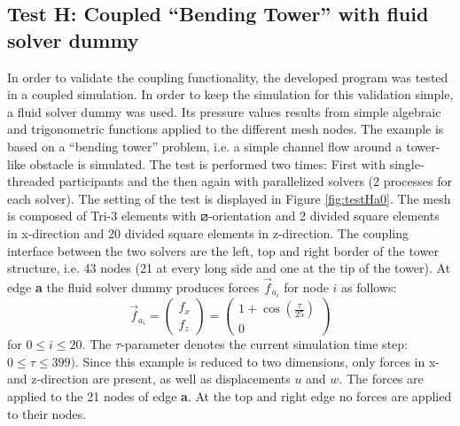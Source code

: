  \subsection{Test H: Coupled ``Bending Tower'' with fluid solver dummy}\label{sec:valid-H}
  In order to validate the coupling functionality, the developed program was tested in a coupled simulation. In order to keep the simulation for this validation simple, a fluid solver dummy was used. Its pressure values results from simple algebraic and trigonometric functions applied to the different mesh nodes. The example is based on a ``bending tower'' problem, i.e. a simple channel flow around a tower-like obstacle is simulated. The test is performed two times: First with single-threaded participants and the then again with parallelized solvers (2 processes for each solver). The setting of the test is displayed in Figure \ref{fig:testHa0}. The mesh is composed of Tri-3 elements with $\boxslash$-orientation and 2 divided square elements in x-direction and 20 divided square elements in z-direction. The coupling interface between the two solvers are the left, top and right border of the tower structure, i.e. 43 nodes (21 at every long side and one at the tip of the tower). At edge \textbf{a} the fluid solver dummy produces forces $\vec{f}_{a_i}$ for node $i$ as follows:
  \begin{equation*}
  \vec{f}_{a_i} = \begin{pmatrix}
  f_x \\ f_z
  \end{pmatrix} =
  \begin{pmatrix}
  1 + \cos\left(\frac{\tau}{25}\right) \\ 0
  \end{pmatrix}
  \end{equation*}
  for $0 \leq i \leq 20$. The $\tau$-parameter denotes the current simulation time step: $0 \leq \tau \leq 399)$. Since this example is reduced to two dimensions, only forces in x- and z-direction are present, as well as displacements $u$ and $w$. The forces are applied to the 21 nodes of edge \textbf{a}. At the top and right edge no forces are applied to their nodes.
  
